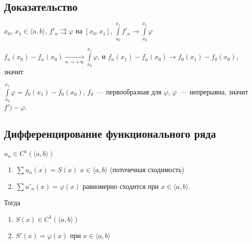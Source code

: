 \documentclass{article}
\begin{document}
        \subsection{Доказательство}
        
            $x_0$, $x_1 \in \langle a, b \rangle$, $f'_n \rightrightarrows \varphi$ на $[x_0, x_1]$, $\int\limits^{x_1}_{x_0} f'_n \rightarrow \int\limits^{x_1}_{x_0} \varphi$
            
            $f_n(x_0) - f_n(x_0) \xrightarrow[n \rightarrow +\infty]{} \int\limits^{x_1}_{x_0} \varphi$, и $f_n(x_1) - f_n(x_0) \rightarrow f_0(x_1) - f_0(x_0)$, значит
            
            $\int\limits^{x_1}_{x_0} \varphi = f_0(x_1) - f_0(x_0)$, $f_0$~--- первообразная для $\varphi$, $\varphi$~--- непрерывна, значит $f') - \varphi$.
            
        \subsection{Дифференцирование функционального ряда}
        
            $u_n \in C^1 \left( \langle a, b \rangle \right)$
            
            \begin{enumerate}
            
                \item $\sum u_n(x) = S(x)$ $x \in \langle a, b \rangle$ (поточечная сходимость)
                
                \item $\sum u'_n(x) = \varphi(x)$ равномерно сходится при $x \in \langle a, b \rangle$.
            
            \end{enumerate}
            
            Тогда
                
            \begin{enumerate}
                
                \item $S(x) \in C^1 \left( \langle a, b \rangle \right)$
                    
                \item $S'(x) = \varphi(x)$ при $x \in \langle a, b \rangle$
                    
            \end{enumerate}
                
\end{document}
